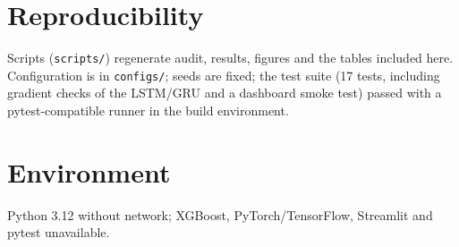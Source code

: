 \section{Reproducibility}
Scripts (\texttt{scripts/}) regenerate audit, results, figures and the tables included here. Configuration is in \texttt{configs/}; seeds are fixed; the test suite (17 tests, including gradient checks of the LSTM/GRU and a dashboard smoke test) passed with a pytest-compatible runner in the build environment.
\section{Environment}
Python 3.12 without network; XGBoost, PyTorch/TensorFlow, Streamlit and pytest unavailable.

